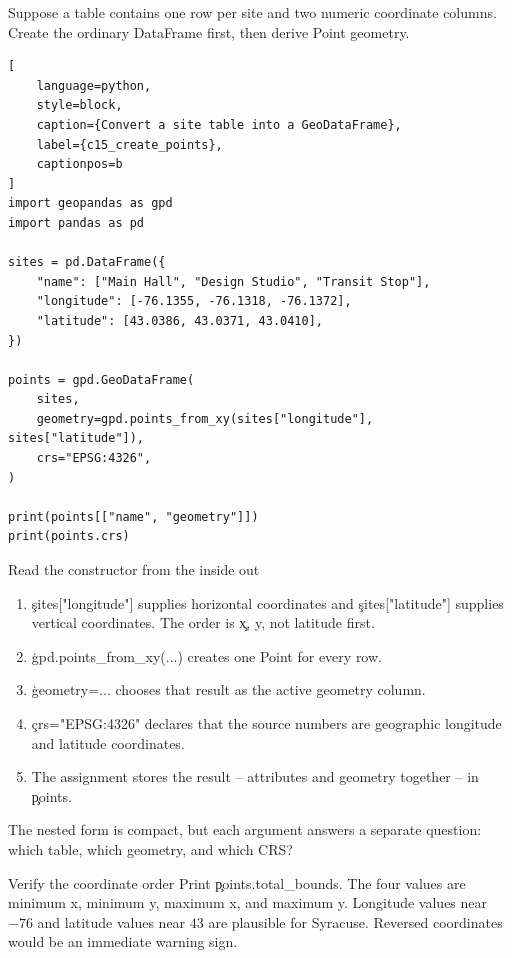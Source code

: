 
Suppose a table contains one row per site and two numeric coordinate columns.
Create the ordinary DataFrame first, then derive Point geometry.

\begin{lstlisting}[
    language=python,
    style=block,
    caption={Convert a site table into a GeoDataFrame},
    label={c15_create_points},
    captionpos=b
]
import geopandas as gpd
import pandas as pd

sites = pd.DataFrame({
    "name": ["Main Hall", "Design Studio", "Transit Stop"],
    "longitude": [-76.1355, -76.1318, -76.1372],
    "latitude": [43.0386, 43.0371, 43.0410],
})

points = gpd.GeoDataFrame(
    sites,
    geometry=gpd.points_from_xy(sites["longitude"], sites["latitude"]),
    crs="EPSG:4326",
)

print(points[["name", "geometry"]])
print(points.crs)
\end{lstlisting}

\begin{SyntaxBox}{Read the constructor from the inside out}
\begin{enumerate}
    \item \c{sites["longitude"]} supplies horizontal coordinates and
          \c{sites["latitude"]} supplies vertical coordinates. The order is
          \c{x, y}, not latitude first.
    \item \c{gpd.points_from_xy(...)} creates one Point for every row.
    \item \c{geometry=...} chooses that result as the active geometry column.
    \item \c{crs="EPSG:4326"} declares that the source numbers are geographic
          longitude and latitude coordinates.
    \item The assignment stores the result -- attributes and geometry together -- in \c{points}.
\end{enumerate}
The nested form is compact, but each argument answers a separate question:
which table, which geometry, and which CRS?
\end{SyntaxBox}

\begin{TryBox}{Verify the coordinate order}
Print \c{points.total_bounds}. The four values are minimum x, minimum y,
maximum x, and maximum y. Longitude values near $-76$ and latitude values near
$43$ are plausible for Syracuse. Reversed coordinates would be an immediate
warning sign.
\end{TryBox}

